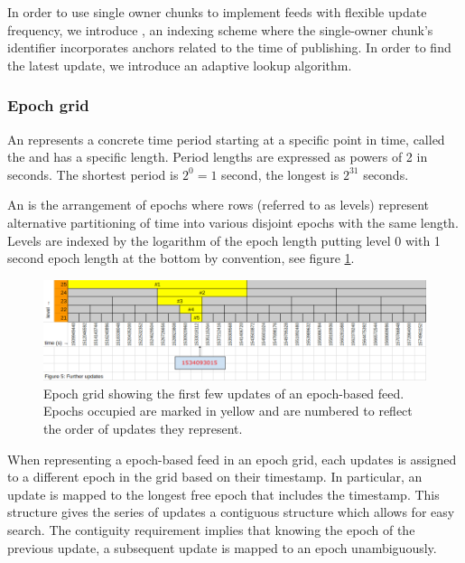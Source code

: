 \yellow{}

In order to use single owner chunks to implement feeds  with flexible update frequency, we introduce , an indexing scheme where the single-owner chunk's identifier incorporates anchors related to the time of publishing. In order to find the latest update, we introduce
an adaptive lookup algorithm. 

\subsubsection{Epoch grid}

An  represents a concrete time period starting at a specific point in time, called the  and has a specific length.  
Period lengths are expressed as powers of 2 in seconds. The shortest period is $2^0 = 1$ second,  the longest is $2^{31}$ seconds. 

An  is the arrangement of epochs where rows (referred to as levels) represent alternative partitioning of time into various disjoint epochs with the same length. Levels are indexed by the logarithm of the epoch length putting level 0 with 1 second epoch length at the bottom by convention, see figure \ref{fig:epoch-grid}.

\begin{figure}[htbp]
\centering
\includegraphics[width=\textwidth]{fig/feeds/02.png}
\caption[Epoch grid showing the first few updates of an epoch-based feed \statusgreen]{Epoch grid showing the first few updates of an epoch-based feed. Epochs occupied are marked in yellow and are numbered to reflect the order of updates they represent. }
\label{fig:epoch-grid}
\end{figure}

When representing a epoch-based feed in an epoch grid, each updates is assigned to a different epoch in the grid based on  their timestamp. In particular, an update is mapped to the longest free epoch that includes the timestamp. This structure gives the series of updates a contiguous structure which allows for easy search. The contiguity requirement implies that knowing the epoch of the previous update, a subsequent update is mapped to an epoch unambiguously.


